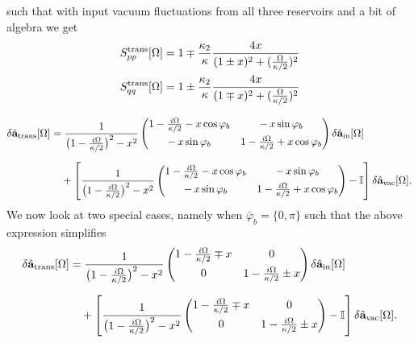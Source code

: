 such that with input vacuum fluctuations from all three reservoirs and a bit of algebra we get 
\begin{equation}
  \begin{split}
    S_{pp}^{\rm trans}[\Omega] &= 1 \mp \frac{\kappa_2}{\kappa} \frac{4x}{(1\pm x)^2+ (\frac{\Omega}{\kappa/2})^2}\\
    S_{qq}^{\rm trans}[\Omega]&=  1 \pm \frac{\kappa_2}{\kappa} \frac{4x}{(1\mp x)^2+ (\frac{\Omega}{\kappa/2})^2}
  \end{split}
\end{equation}




\newpage
\begin{equation}
\begingroup
\setlength{\arraycolsep}{5pt}
\renewcommand{\arraystretch}{1.1}
\begin{aligned}
\delta\hat{\mathbf a}_{\mathrm{trans}}[\Omega]
&=
\frac{1}{\bigl(1-\tfrac{i\Omega}{\kappa/2}\bigr)^2 - x^2}
\begin{pmatrix}
1-\tfrac{i\Omega}{\kappa/2}-x\cos\varphi_b & -\,x\sin\varphi_b \\[4pt]
-\,x\sin\varphi_b & 1-\tfrac{i\Omega}{\kappa/2}+x\cos\varphi_b
\end{pmatrix}
\delta\hat{\mathbf a}_{\mathrm{in}}[\Omega] \\[6pt]
&\quad+
\left[
\frac{1}{\bigl(1-\tfrac{i\Omega}{\kappa/2}\bigr)^2 - x^2}
\begin{pmatrix}
1-\tfrac{i\Omega}{\kappa/2}-x\cos\varphi_b & -\,x\sin\varphi_b \\[4pt]
-\,x\sin\varphi_b & 1-\tfrac{i\Omega}{\kappa/2}+x\cos\varphi_b
\end{pmatrix}
- \mathbb{I}
\right]
\delta\hat{\mathbf a}_{\mathrm{vac}}[\Omega].
\end{aligned}
\endgroup
\end{equation}
We now look at two special cases, namely when $\bar\varphi_b=\{0,\pi\}$ such that the above expression simplifies 
\begin{equation}
\begingroup
\setlength{\arraycolsep}{5pt}
\renewcommand{\arraystretch}{1.1}
\begin{aligned}
\delta\hat{\mathbf a}_{\mathrm{trans}}[\Omega]
&=
\frac{1}{\bigl(1-\tfrac{i\Omega}{\kappa/2}\bigr)^2 - x^2}
\begin{pmatrix}
1-\tfrac{i\Omega}{\kappa/2}\mp x & 0 \\[4pt]
0 & 1-\tfrac{i\Omega}{\kappa/2}\pm x
\end{pmatrix}
\delta\hat{\mathbf a}_{\mathrm{in}}[\Omega] \\[6pt]
&\quad+
\left[
\frac{1}{\bigl(1-\tfrac{i\Omega}{\kappa/2}\bigr)^2 - x^2}
\begin{pmatrix}
1-\tfrac{i\Omega}{\kappa/2}\mp x &0\\[4pt]
0 & 1-\tfrac{i\Omega}{\kappa/2}\pm x
\end{pmatrix}
- \mathbb{I}
\right]
\delta\hat{\mathbf a}_{\mathrm{vac}}[\Omega].
\end{aligned}
\endgroup
\end{equation}


